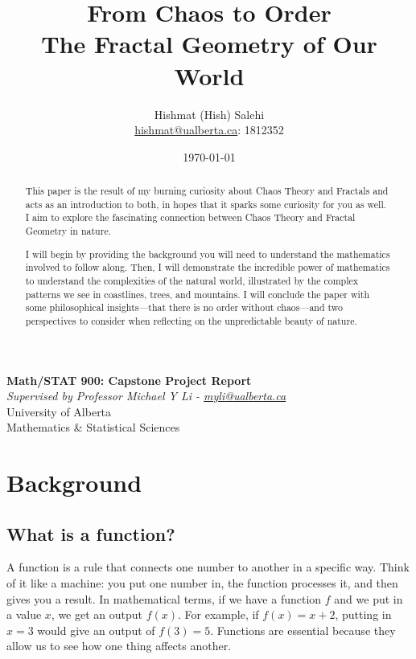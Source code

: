 \documentclass[12pt]{article}
\title{From Chaos to Order\\
       \large The Fractal Geometry of Our World}
\author{Hishmat (Hish) Salehi \\
\href{mailto:hishmat@ualberta.ca}{hishmat@ualberta.ca}: 1812352}
\date{\today}
\begin{document}
\maketitle

\begin{center}
\textbf{Math/STAT 900: Capstone Project Report}  \\
\emph{Supervised by Professor Michael Y Li - 
\href{mailto:myli@ualberta.ca}{myli@ualberta.ca}}  \\
University of Alberta \\
Mathematics \& Statistical Sciences
\end{center}

\begin{abstract}
This paper is the result of my burning curiosity about Chaos Theory and Fractals and acts as an introduction to both, in hopes that it sparks some curiosity for you as well. I aim to explore the fascinating connection between Chaos Theory and Fractal Geometry in nature. 

I will begin by providing the background you will need to understand the mathematics involved to follow along. Then, I will demonstrate the incredible power of mathematics to understand the complexities of the natural world, illustrated by the complex patterns we see in coastlines, trees, and mountains. I will conclude the paper with some philosophical insights—that there is no order without chaos—and two perspectives to consider when reflecting on the unpredictable beauty of nature.
\end{abstract}

\newpage

\tableofcontents

\section{Background}

\subsection{What is a function?}
A function is a rule that connects one number to another in a specific way. Think of it like a machine: you put one number in, the function processes it, and then gives you a result. In mathematical terms, if we have a function \( f \) and we put in a value \( x \), we get an output \( f(x) \). For example, if \( f(x) = x + 2 \), putting in \( x = 3 \) would give an output of \( f(3) = 5 \). Functions are essential because they allow us to see how one thing affects another.
\end{document}
